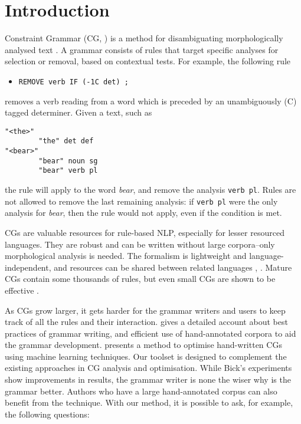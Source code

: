 \section{Introduction}
\label{sec:intro}

Constraint Grammar (CG, \cite{karlsson1995constraint})
is a method for disambiguating morphologically analysed text%
. 
A grammar consists of rules that target specific analyses for selection or removal, based on contextual tests. For example, the following rule
\begin{itemize}
\item[] \texttt{REMOVE verb IF (-1C det) ;}
\end{itemize}
removes a verb reading from a word which is preceded by an unambiguously (C) tagged determiner.
Given a text, such as

\begin{verbatim}
"<the>"
        "the" det def
"<bear>"
        "bear" noun sg
        "bear" verb pl
\end{verbatim}

the rule will apply to the word \emph{bear}, and remove the analysis \texttt{verb pl}.
Rules are not allowed to remove the last remaining analysis: if  \texttt{verb pl} were the only analysis for \emph{bear}, then the rule would not apply, even if the condition is met.

CGs are valuable resources for rule-based NLP, especially for lesser resourced languages. They are robust and can be written without large corpora--only morphological analysis is needed. The formalism is lightweight and language-independent, and resources can be shared between related languages \cite{bick2006spanish}, \cite{lene_trond_linda2010}.
Mature CGs contain some thousands of rules, but even small CGs are shown to be effective \cite{lene_trond2011}.

As CGs grow larger, it gets harder for the grammar writers and users to keep track of all the rules and their interaction.
\cite{voutilainen2004} gives a detailed account about best practices of grammar writing, and efficient use of hand-annotated corpora to aid the grammar development.
\cite{bick2013tuning} presents a method to optimise hand-written CGs using machine learning techniques.
Our toolset is designed to complement the existing approaches in CG analysis and optimisation.
While Bick's experiments show improvements in results, the grammar writer is none the wiser why is the grammar better.
Authors who have a large hand-annotated corpus can also benefit from the technique.
With our method, it is possible to ask, for example, the following questions:

